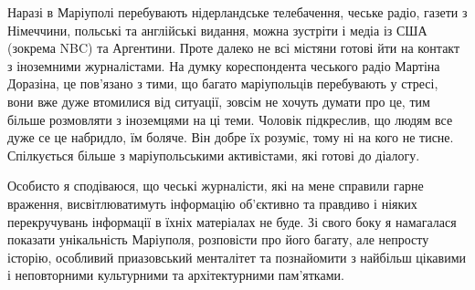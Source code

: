 
Наразі в Маріуполі перебувають нідерландське телебачення, чеське радіо, газети
з Німеччини, польські та англійські видання, можна зустріти і медіа із  США
(зокрема NBC) та Аргентини. Проте далеко не всі містяни готові йти на контакт з
іноземними журналістами. На думку кореспондента чеського радіо Мартіна
Доразіна, це пов'язано з тими, що багато маріупольців перебувають у стресі,
вони вже дуже втомилися від ситуації, зовсім не хочуть думати про це, тим
більше розмовляти з іноземцями на ці теми. Чоловік підкреслив, що людям все
дуже се це набридло, їм боляче. Він добре їх розуміє, тому ні на кого не тисне.
Спілкується більше з маріупольськими активістами, які готові до діалогу. 

Особисто я сподіваюся, що чеські журналісти, які на мене справили гарне
враження, висвітлюватимуть інформацію об'єктивно та правдиво і ніяких
перекручувань інформації в їхніх матеріалах не буде. Зі свого боку я намагалася
показати унікальність Маріуполя, розповісти про його багату, але непросту
історію, особливий приазовський менталітет та познайомити з найбільш цікавими і
неповторними культурними та архітектурними пам'ятками.
